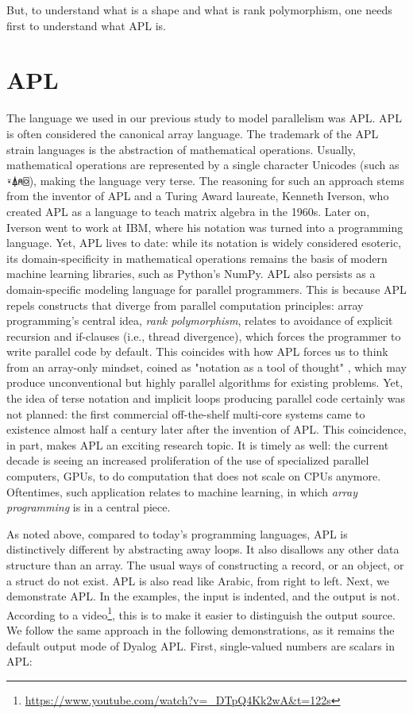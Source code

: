 \documentclass{report}
\begin{document}
But, to understand what is a shape and what is rank polymorphism, one needs first to understand what APL is.

\section{APL}

The language we used in our previous study to model parallelism was APL. APL is often considered the canonical array language. The trademark of the APL strain languages is the abstraction of mathematical operations. Usually, mathematical operations are represented by a single character Unicodes (such as \verb|⍣⍋⍝⌺|), making the language very terse. The reasoning for such an approach stems from the inventor of APL and a Turing Award laureate, Kenneth Iverson, who created APL as a language to teach matrix algebra in the 1960s. Later on, Iverson went to work at IBM, where his notation was turned into a programming language. Yet, APL lives to date: while its notation is widely considered esoteric, its domain-specificity in mathematical operations remains the basis of modern machine learning libraries, such as Python's NumPy. APL also persists as a domain-specific modeling language for parallel programmers. This is because APL repels constructs that diverge from parallel computation principles: array programming's central idea, \emph{rank polymorphism}, relates to avoidance of explicit recursion and if-clauses (i.e., thread divergence), which forces the programmer to write parallel code by default. This coincides with how APL forces us to think from an array-only mindset, coined as "notation as a tool of thought" \cite{iverson2007notation}, which may produce unconventional but highly parallel algorithms for existing problems. Yet, the idea of terse notation and implicit loops producing parallel code certainly was not planned: the first commercial off-the-shelf multi-core systems came to existence almost half a century later after the invention of APL. This coincidence, in part, makes APL an exciting research topic. It is timely as well: the current decade is seeing an increased proliferation of the use of specialized parallel computers, GPUs, to do computation that does not scale on CPUs anymore. Oftentimes, such application relates to machine learning, in which \emph{array programming} is in a central piece.

As noted above, compared to today's programming languages, APL is distinctively different by abstracting away loops. It also disallows any other data structure than an array. The usual ways of constructing a record, or an object, or a struct do not exist. APL is also read like Arabic, from right to left. Next, we demonstrate APL. In the examples, the input is indented, and the output is not. According to a video\footnote{\url{https://www.youtube.com/watch?v=_DTpQ4Kk2wA&t=122s}}, this is to make it easier to distinguish the output source. We follow the same approach in the following demonstrations, as it remains the default output mode of Dyalog APL. First, single-valued numbers are scalars in APL:
\end{document}
